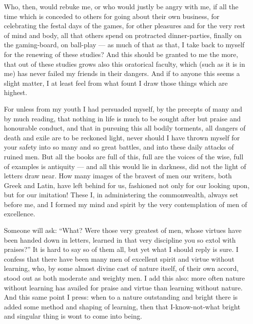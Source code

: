  Who, then, would rebuke me, or who would justly be angry with me, if all the time which is conceded to others for going about their own business, for celebrating the festal days of the games, for other pleasures and for the very rest of mind and body, all that others spend on protracted dinner-parties, finally on the gaming-board, on ball-play --- as much of that as that, I take back to myself for the renewing of these studies? And this should be granted to me the more, that out of these studies grows also this oratorical faculty, which (such as it is in me) has never failed my friends in their dangers. And if to anyone this seems a slight matter, I at least feel from what fount I draw those things which are highest.

 For unless from my youth I had persuaded myself, by the precepts of many and by much reading, that nothing in life is much to be sought after but praise and honourable conduct, and that in pursuing this all bodily torments, all dangers of death and exile are to be reckoned light, never should I have thrown myself for your safety into so many and so great battles, and into these daily attacks of ruined men. But all the books are full of this, full are the voices of the wise, full of examples is antiquity --- and all this would lie in darkness, did not the light of letters draw near. How many images of the bravest of men our writers, both Greek and Latin, have left behind for us, fashioned not only for our looking upon, but for our imitation! These I, in administering the commonwealth, always set before me, and I formed my mind and spirit by the very contemplation of men of excellence.

 Someone will ask: ``What? Were those very greatest of men, whose virtues have been handed down in letters, learned in that very discipline you so extol with praises?'' It is hard to say so of them all, but yet what I should reply is sure. I confess that there have been many men of excellent spirit and virtue without learning, who, by some almost divine cast of nature itself, of their own accord, stood out as both moderate and weighty men. I add this also: more often nature without learning has availed for praise and virtue than learning without nature. And this same point I press: when to a nature outstanding and bright there is added some method and shaping of learning, then that I-know-not-what bright and singular thing is wont to come into being.

